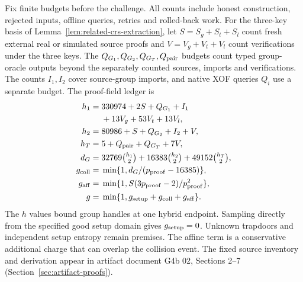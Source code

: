 \documentclass[conference,compsoc]{IEEEtran}
\theoremstyle{definition}
\numberwithin{equation}{section}
\numberwithin{table}{section}
\numberwithin{figure}{section}
\theoremstyle{plain}
\begin{document}
\label{app:primitive-reductions}
Fix finite budgets before the challenge. All counts include honest
construction, rejected inputs, offline queries, retries and rolled-back work.
For the three-key basis of Lemma~\ref{lem:related-crs-extraction}, let
\(S=S_g+S_t+S_l\) count fresh external real or simulated source proofs and
\(V=V_g+V_t+V_l\) count verifications under the three keys. The \(Q_{G_1},
Q_{G_2},Q_{G_T},Q_{\rm pair}\) budgets count typed group-oracle outputs
beyond the separately counted sources, imports and verifications. The counts
\(I_1,I_2\) cover source-group imports, and native XOF queries \(Q_i\) use a
separate budget. The proof-field ledger is
\begin{align}
 h_1={}&330974+2S+Q_{G_1}+I_1\notag\\
       &+13V_g+53V_t+13V_l,\notag\\
 h_2={}&80986+S+Q_{G_2}+I_2+V,\notag\\
 h_T={}&5+Q_{\rm pair}+Q_{G_T}+7V,\notag\\
 d_G={}&32769\tbinom{h_1}{2}+16383\tbinom{h_2}{2}
       +49152\tbinom{h_T}{2},\notag\\
 g_{\rm coll}={}&\min\{1,d_G/(p_{\rm proof}-16385)\},\notag\\
 g_{\rm aff}={}&\min\{1,S(3p_{\rm proof}-2)/p_{\rm proof}^2\},\notag\\
 g={}&\min\{1,g_{\rm setup}+g_{\rm coll}+g_{\rm aff}\}.
 \label{eq:groth-budget}
\end{align}
The \(h\) values bound group handles at one hybrid endpoint. Sampling directly
from the specified good setup domain gives \(g_{\rm setup}=0\). Unknown
trapdoors and independent setup entropy remain premises. The affine term is a
conservative additional charge that can overlap the collision event. The fixed
source inventory and derivation appear in artifact document G4b 02,
Sections 2--7 (Section~\ref{sec:artifact-proofs}).
\end{document}
